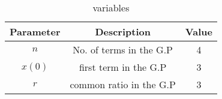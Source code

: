\begin{table}[h]
  \centering
  \renewcommand{\arraystretch}{1.5}
\begin{tabular}{|c|c|c|}
\hline
Parameter & Description & Value \\\hline
\( n \) & No. of terms in the G.P &4 \\\hline
\(x(0) \) & first term in the G.P&3 \\\hline
\( r \) & common ratio in the G.P& 3 \\\hline
\end{tabular}
\caption{variables}
  \label{tab:xn}
\end{table}